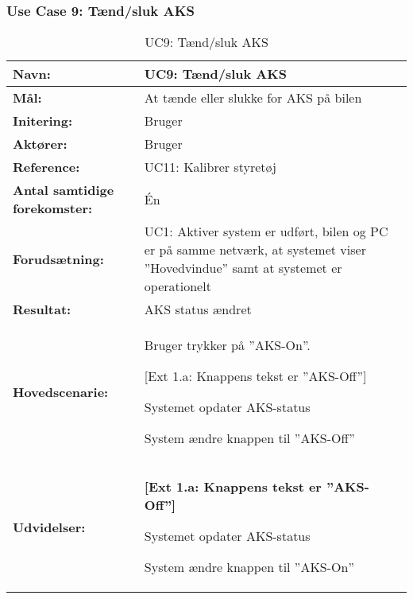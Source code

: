 \subsubsection{Use Case 9: Tænd/sluk AKS}
\begin{table}[h]
\begin{tabularx}{\textwidth}{| L{3.3 cm} | Z |} 																			   \hline

\textbf{Navn:} 						& UC9: Tænd/sluk AKS 																	\\ \hline
\textbf{Mål:}						& At tænde eller slukke for AKS på bilen 												\\ \hline
\textbf{Initering:}					& Bruger 																				\\ \hline
\textbf{Aktører:} 					& Bruger 																				\\ \hline  
\textbf{Reference:} 				& UC11: Kalibrer styretøj																\\ \hline
\textbf{Antal samtidige forekomster:} & Én 																					\\ \hline
\textbf{Forudsætning:} 				& UC1: Aktiver system er udført, bilen og PC er på samme netværk, 
									   at systemet viser ''Hovedvindue'' samt at systemet er operationelt					\\ \hline
\textbf{Resultat:}					&  AKS status ændret																				\\ \hline
\textbf{Hovedscenarie:}				& 

\begin{packed_enum}
\item Bruger trykker på ''AKS-On''.
		\begin{packed_item}\itemsep1pt \parskip0pt 
			\item {[}Ext 1.a: Knappens tekst er ''AKS-Off''{]}
		\end{packed_item}
\item Systemet opdater AKS-status
\item System ændre knappen til ''AKS-Off''
\end{packed_enum} 																											\\ \hline
\textbf{Udvidelser:}				&  
\textbf{{[}Ext 1.a: Knappens tekst er ''AKS-Off''{]}}
	\begin{packed_enum}\itemsep1pt \parskip0pt 
		\item Systemet opdater AKS-status
		\item System ændre knappen til ''AKS-On''
	\end{packed_enum}	
																															\\ \hline
\end{tabularx}
\caption{UC9: Tænd/sluk AKS}
\label{tbl:UC9}
\end{table}